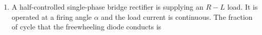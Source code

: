 \documentclass[journal]{IEEEtran}
\begin{document}
\begin{enumerate}
\begin{enumerate}
\end{enumerate}
\item A half-controlled single-phase bridge rectifier is supplying an $R-L$ load. It is operated at a firing angle $\alpha$ and the load current is continuous. The fraction of cycle that the freewheeling diode conducts is
	\begin{enumerate}
\end{enumerate}


\end{enumerate}
\end{document}
